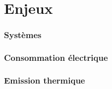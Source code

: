 \section{Enjeux}

\begin{frame}
	\frametitle{Systèmes}
\end{frame}

\begin{frame}
	\frametitle{Consommation électrique}
\end{frame}

\begin{frame}
	\frametitle{Emission thermique}
\end{frame}



